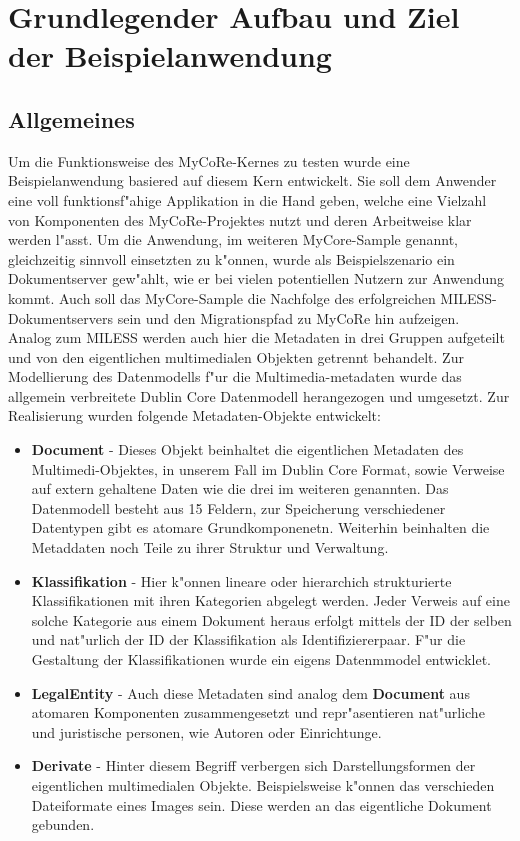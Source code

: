 %
%
\section{Grundlegender Aufbau und Ziel der Beispielanwendung}
%
%
\subsection{Allgemeines}
Um die Funktionsweise des MyCoRe-Kernes zu testen wurde eine Beispielanwendung basiered auf diesem Kern entwickelt. Sie soll dem Anwender eine voll funktionsf"ahige Applikation in die Hand geben, welche eine Vielzahl von Komponenten des MyCoRe-Projektes nutzt und deren Arbeitweise klar werden l"asst. Um die Anwendung, im weiteren MyCore-Sample genannt, gleichzeitig sinnvoll einsetzten zu k"onnen, wurde als Beispielszenario ein Dokumentserver gew"ahlt, wie er bei vielen potentiellen Nutzern zur Anwendung kommt. Auch soll das MyCore-Sample die Nachfolge des erfolgreichen MILESS-Dokumentservers sein und den Migrationspfad zu MyCoRe hin aufzeigen. \\[2ex]
Analog zum MILESS werden auch hier die Metadaten in drei Gruppen aufgeteilt und von den eigentlichen multimedialen Objekten getrennt behandelt. Zur Modellierung des Datenmodells f"ur die Multimedia-metadaten wurde das allgemein verbreitete Dublin Core Datenmodell herangezogen und umgesetzt. Zur Realisierung wurden folgende Metadaten-Objekte entwickelt:
\begin{itemize}
\item {\bf Document} - Dieses Objekt beinhaltet die eigentlichen Metadaten des Multimedi-Objektes, in unserem Fall im Dublin Core Format, sowie Verweise auf extern gehaltene Daten wie die drei im weiteren genannten. Das Datenmodell besteht aus 15 Feldern, zur Speicherung verschiedener Datentypen gibt es atomare Grundkomponenetn. Weiterhin beinhalten die Metaddaten noch Teile zu ihrer Struktur und Verwaltung.
\item {\bf Klassifikation} - Hier k"onnen lineare oder hierarchich strukturierte Klassifikationen mit ihren Kategorien abgelegt werden. Jeder Verweis auf eine solche Kategorie aus einem Dokument heraus erfolgt mittels der ID der selben und nat"urlich der ID der Klassifikation als Identifiziererpaar. F"ur die Gestaltung der Klassifikationen wurde ein eigens Datenmmodel entwicklet.
\item {\bf LegalEntity} - Auch diese Metadaten sind analog dem {\bf Document} aus atomaren Komponenten zusammengesetzt und repr"asentieren nat"urliche und juristische personen, wie Autoren oder Einrichtunge.
\item {\bf Derivate} - Hinter diesem Begriff verbergen sich Darstellungsformen der eigentlichen multimedialen Objekte. Beispielsweise k"onnen das verschieden Dateiformate eines Images sein. Diese werden an das eigentliche Dokument gebunden.
\end{itemize}
